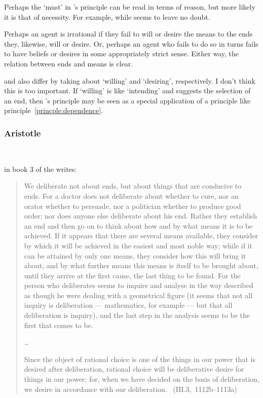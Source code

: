 \documentclass[10pt]{article}
\newcommand{\hozline}[0]{%
  \noindent\hdashrule[0.5ex][c]{\textwidth}{.1pt}{}
}
\newcommand{\hozlinedash}[0]{%
  \noindent\hdashrule[0.5ex][c]{\textwidth}{.1pt}{2.5pt}
}
\begin{document}
Perhaps the `must' in \citeauthor{Hume:2011aa}'s principle can be read in terms of reason, but more likely it is that of necessity.
For example, while \citeauthor{Sinhababu:2017aa} seems to leave no doubt.

Perhaps an agent is irrational if they fail to will or desire the means to the ends they, likewise, will or desire.
Or, perhaps an agent who fails to do so in turns fails to have beliefs or desires in some appropriately strict sense.
Either way, the relation between ends and means is clear.

\hozlinedash

\citeauthor{Kant:1948aa} and \citeauthor{Hume:2011aa} also differ by taking about `willing' and `desiring', respectively.
I don't think this is too important.
If `willing' is like `intending' and suggests the selection of an end, then \citeauthor{Kant:1948aa}'s principle may be seen as a special application of a principle like principle~\ref{princple:dependence}.

\hozline


\subsubsection*{Aristotle}\mbox{ }

\citeauthor{Aristotle:2000aa} in book 3 of the  writes:

\begin{quote}
  We deliberate not about ends, but about things that are conducive to ends.
  For a doctor does not deliberate about whether to cure, nor an orator whether to persuade, nor a politician whether to produce good order; nor does anyone else deliberate about his end. Rather they establish an end and then go on to think about how and by what means it is to be achieved.
  If it appears that there are several means available, they consider by which it will be achieved in the easiest and most noble way; while if it can be attained by only one means, they consider how this will bring it about, and by what further means this means is itself to be brought about, until they arrive at the first cause, the last thing to be found.
  For the person who deliberates seems to inquire and analyse in the way described as though he were dealing with a geometrical figure (it seems that not all inquiry is deliberation --- mathematics, for example --- but that all deliberation is inquiry), and the last step in the analysis seems to be the first that comes to be.

  \dots

  Since the object of rational choice is one of the things in our power that is desired after deliberation, rational choice will be deliberative desire for things in our power; for, when we have decided on the basis of deliberation, we desire in accordance with our deliberation.\nolinebreak
  \mbox{ }\hfill\mbox{(III.3, 1112b--1113a)}
\end{quote}
\end{document}

